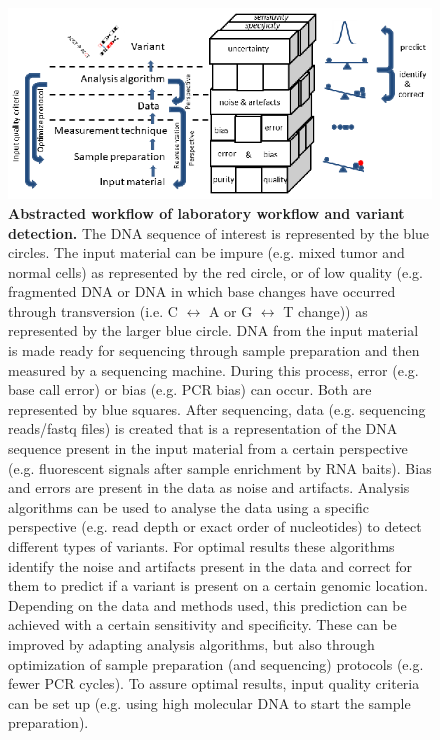 \begin{figure}
	\includegraphics[width=1.0\linewidth]{img/Chapter11_fig1}
	\caption[Abstracted workflow of laboratory workflow and variant detection]{\textbf{Abstracted workflow of laboratory workflow and variant detection.} The DNA sequence of interest is represented by the blue circles. The input material can be impure (e.g. mixed tumor and normal cells) as represented by the red circle, or of low quality (e.g. fragmented DNA or DNA in which base changes have occurred through transversion (i.e. C $\leftrightarrow$ A or G $\leftrightarrow$ T change)) as represented by the larger blue circle. DNA from the input material is made ready for sequencing through sample preparation and then measured by a sequencing machine. During this process, error (e.g. base call error) or bias (e.g. PCR bias) can occur. Both are represented by blue squares. After sequencing, data (e.g. sequencing reads/fastq files) is created that is a representation of the DNA sequence present in the input material from a certain perspective (e.g. fluorescent signals after sample enrichment by RNA baits). Bias and errors are present in the data as noise and artifacts. Analysis algorithms can be used to analyse the data using a specific perspective (e.g. read depth or exact order of nucleotides) to detect different types of variants. For optimal results these algorithms identify the noise and artifacts present in the data and correct for them to predict if a variant is present on a certain genomic location. Depending on the data and methods used, this prediction can be achieved with a certain sensitivity and specificity. These can be improved by adapting analysis algorithms, but also through optimization of sample preparation (and sequencing) protocols (e.g. fewer PCR cycles). To assure optimal results, input quality criteria can be set up (e.g. using high molecular DNA to start the sample preparation).}
	\label{fig:Chapter11_Fig1}
\end{figure}

